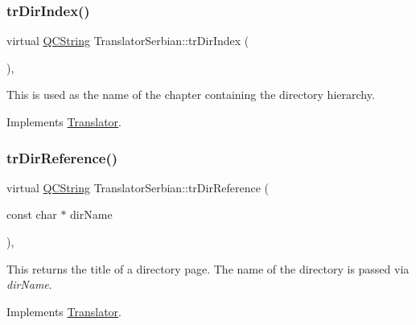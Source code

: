 \mbox{\label{class_translator_serbian_a2e76bd4bc0e0d49a043ddc485eae6af7}} 
\subsubsection{\texorpdfstring{trDirIndex()}{trDirIndex()}}
{\footnotesize\ttfamily virtual \mbox{\hyperlink{class_q_c_string}{Q\+C\+String}} Translator\+Serbian\+::tr\+Dir\+Index (\begin{DoxyParamCaption}{ }\end{DoxyParamCaption})\hspace{0.3cm}{\ttfamily [inline]}, {\ttfamily [virtual]}}

This is used as the name of the chapter containing the directory hierarchy. 

Implements \mbox{\hyperlink{class_translator}{Translator}}.

\mbox{\label{class_translator_serbian_ac5c3eb375c6cd9ff58ada3a9a9066d26}} 
\subsubsection{\texorpdfstring{trDirReference()}{trDirReference()}}
{\footnotesize\ttfamily virtual \mbox{\hyperlink{class_q_c_string}{Q\+C\+String}} Translator\+Serbian\+::tr\+Dir\+Reference (\begin{DoxyParamCaption}\item[{const char $\ast$}]{dir\+Name }\end{DoxyParamCaption})\hspace{0.3cm}{\ttfamily [inline]}, {\ttfamily [virtual]}}

This returns the title of a directory page. The name of the directory is passed via {\itshape dir\+Name}. 

Implements \mbox{\hyperlink{class_translator}{Translator}}.

\mbox{\label{class_translator_serbian_a1e8c8bb73eebe0042b4f8961162b589c}} 
